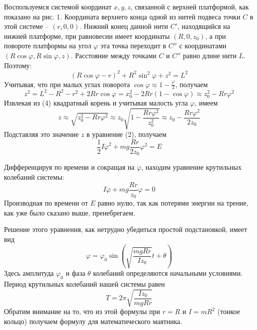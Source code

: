 \documentclass[a4paper,12pt]{article} %
\begin{document}
Воспользуемся системой координат $x, y, z$, связанной с верхней платформой, как показано на рис. 1. Координата верхнего конца одной из нитей подвеса точки $C$ в этой системе -- $(r, 0, 0)$. Нижний конец данной нити $C'$, находящийся на нижней платформе, при равновесии имеет координаты $(R, 0, z_0)$, а при повороте платформы на угол $\varphi$ эта точка переходит в $C''$ с координатами $(R\cos\varphi, R\sin\varphi, z)$. Расстояние между точками $C$ и $C''$ равно длине нити $L$. Поэтому:
\begin{equation}
(R\cos\varphi-r)^2 + R^2\sin^2\varphi + z^2 = L^2
\end{equation}
Учитывая, что при малых углах поворота $\cos\varphi\approx 1 - \frac{\varphi}{2}$, получаем 
\begin{equation}
z^2 = L^2 - R^2 - r^2 + 2Rr\cos\varphi = x_0^2 - 2Rr(1-\cos\varphi) \approx z_0^2 - Rr\varphi^2
\end{equation}
Извлекая из (4) квадратный корень и учитывая малость угла $\varphi$, имеем
\begin{equation}
z \approx \sqrt{z_0^2 - Rr\varphi^2}\approx z_0\sqrt{1 - \frac{Rr\varphi^2}{z_0^2}}\approx z_0 - \frac{Rr\varphi^2}{2z_0}
\end{equation}
Подставляя это значение $z$ в уравнение (2), получаем
\begin{equation}
\frac{1}{2}I\dot\varphi^2 + mg\frac{Rr}{2z_0}\varphi^2 = E
\end{equation}

Дифференцируя по времени и сокращая на $\dot{\varphi}$, находим уравнение крутильных колебаний системы:
\begin{equation}
I\ddot{\varphi}+mg\frac{Rr}{z_0}\varphi = 0
\end{equation}
Производная по времени от $E$ равно нулю, так как потерями энергии на трение, как уже было сказано выше, пренебрегаем.

Решение этого уравнения, как нетрудно убедиться простой подстановкой, имеет вид
\begin{equation}
\varphi = \varphi_0\sin\left(\sqrt{\frac{mgRr}{Iz_0}}t+\theta\right)
\end{equation}
Здесь амплитуда $\varphi_0$ и фаза $\theta$ колебаний определяются начальными условиями. Период крутильных колебаний нашей системы равен
\begin{equation}
T = 2\pi\sqrt{\frac{Iz_0}{mgRr}}
\end{equation}
Обратим внимание на то, что из этой формулы при $r = R$ и $I = mR^2$ (тонкое кольцо) получаем формулу для математического маятника.
\end{document}
